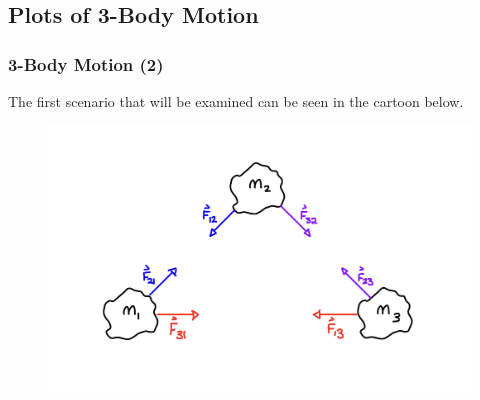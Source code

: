\documentclass{beamer}
\begin{document}
\subsection{\tiny{Plots of 3-Body Motion}}
\begin{frame}
\frametitle{3-Body Motion (2)}
The first scenario that will be examined can be seen in the cartoon below.
\begin{figure}[htpb]
\begin{center}
\includegraphics[width=0.85\linewidth]{3BodyCartoon1.png} 
\end{center}
\end{figure}
\end{frame}
\end{document}
